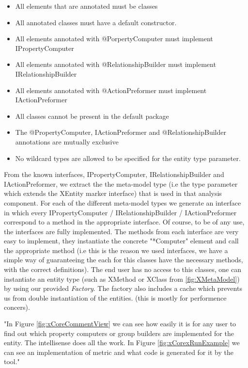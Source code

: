         \begin{itemize}
              \item All elements that are annotated must be classes
              \item All annotated classes must have a default constructor.
              \item All elements annotated with @PorpertyComputer must implement
         IPropertyComputer
              \item All elements annotated with @RelationshipBuilder must implement
         IRelationshipBuilder
              \item All elements annotated with @ActionPreformer must implement
         IActionPreformer
              \item  All classes cannot be present in the default package
              \item  The @PropertyComputer, IActionPreformer and @RelationshipBuilder annotations are mutually
        exclusive
              \item  No wildcard types are allowed to be specified for the entity type
         parameter.
            \end{itemize}

        From the known interfaces, IPropertyComputer, IRelationshipBuilder and IActionPreformer, we extract the the meta-model type (i.e the type parameter which extends the XEntity marker interface) 
that is used in that analysis component. For each of the different meta-model types we generate an interface in which every IPropertyComputer / IRelationshipBuilder / IActionPreformer correspond to
a method in the appropriate interface. Of course, to be of any use, the interfaces are fully implemented. The methods from each interface are very easy to implement, they instantiate the concrete "*Computer"
element and call the appropriate method (i.e this is the reason we used interfaces, we have a simple way of guaranteeing the each for this classes have the necessary methods, with the correct definitions). 
The end user has no access to this classes, one can instantiate an entity type (such as XMethod or XClass from \ref{fig:XMetaModel}) by using our provided \textit{Factory}. The factory also includes a cache 
which prevents us from double instantiation of the entities. (this is mostly for performence concers).

        "In Figure \ref{fig:xCoreCommentView} we can see how easily it is for any user to find out which property computers or group builders are implemented for the
entity. The intellisense does all the work. In Figure \ref{fig:xCorexRunExample} we can see an implementation of metric and what code is generated for it by the tool." \cite{oldThesis}

